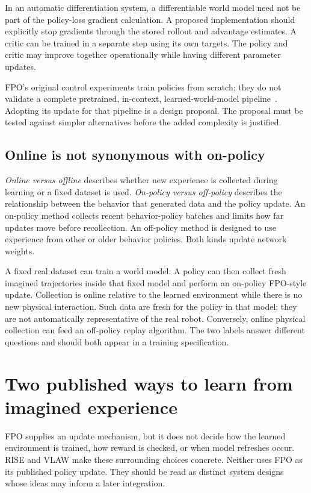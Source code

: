 In an automatic differentiation system, a differentiable world model need not be part of the policy-loss gradient calculation. A proposed implementation should explicitly stop gradients through the stored rollout and advantage estimates. A critic can be trained in a separate step using its own targets. The policy and critic may improve together operationally while having different parameter updates.

FPO's original control experiments train policies from scratch; they do not validate a complete pretrained, in-context, learned-world-model pipeline~\citep{fpo}. Adopting its update for that pipeline is a design proposal. The proposal must be tested against simpler alternatives before the added complexity is justified.

\subsection{Online is not synonymous with on-policy}
\emph{Online versus offline} describes whether new experience is collected during learning or a fixed dataset is used. \emph{On-policy versus off-policy} describes the relationship between the behavior that generated data and the policy update. An on-policy method collects recent behavior-policy batches and limits how far updates move before recollection. An off-policy method is designed to use experience from other or older behavior policies. Both kinds update network weights.

A fixed real dataset can train a world model. A policy can then collect fresh imagined trajectories inside that fixed model and perform an on-policy FPO-style update. Collection is online relative to the learned environment while there is no new physical interaction. Such data are fresh for the policy in that model; they are not automatically representative of the real robot. Conversely, online physical collection can feed an off-policy replay algorithm. The two labels answer different questions and should both appear in a training specification.


\section{Two published ways to learn from imagined experience}
FPO supplies an update mechanism, but it does not decide how the learned environment is trained, how reward is checked, or when model refreshes occur. RISE and VLAW make these surrounding choices concrete. Neither uses FPO as its published policy update. They should be read as distinct system designs whose ideas may inform a later integration.

